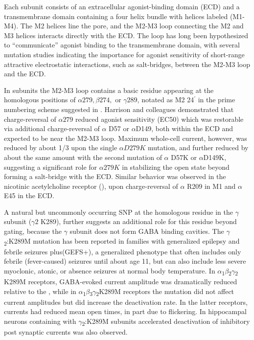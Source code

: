 \documentclass[9pt,twocolumn,twoside,lineno]{pnas-new}
\begin{document}
Each subunit consists of an extracellular agonist-binding domain (ECD) and a transmembrane domain containing a four helix bundle with helices labeled (M1-M4).  The M2 helices line the pore, and the M2-M3 loop connecting the M2 and M3 helices interacts directly with the ECD.  The loop has long been hypothesized to ``communicate'' agonist binding to the transmembrane domain,\cite{Campos-Caro1996,Lynch1997,Grosman2000,Bera2002,Lummis2005,Law2005,Lee2005,Unwin2005, Lee2009} with several mutation studies indicating the importance for agonist sensitivity of short-range attractive electrostatic interactions, such as salt-bridges, between the M2-M3 loop and the ECD. \cite{Sigel1999, OShea2000, Kash2003, Hales2006} 

In \GABAA subunits the M2-M3 loop contains a basic residue appearing at the homologous positions of $\alpha279, \beta274,$ or $\gamma289$, notated as M2 24$^{\prime}$ in the prime numbering scheme suggested in \cite{Jaiteh2016}.  Harrison and colleagues\cite{Kash2003} demonstrated that charge-reversal of $\alpha279$ reduced agonist sensitivity (EC50) which was restorable via additional charge-reversal of $\alpha$ D57 or $\alpha$D149, both within the ECD and expected to be near the M2-M3 loop.  Maximum whole-cell current, however, was reduced by about 1/3 upon the single $\alpha D279K$ mutation, and further reduced by about the same amount with the second mutation of $\alpha$ D57K or $\alpha$D149K, suggesting a significant role for $\alpha279K$ in stabilizing the open state beyond forming a salt-bridge with the ECD.  Similar behavior was observed in the nicotinic acetylcholine receptor (\nachr), upon charge-reversal of  $\alpha$ R209 in M1 and $\alpha$ E45 in the ECD.\cite{Lee2005}  

A natural but uncommonly occurring SNP at the homologous residue in the $\gamma$ subunit ($\gamma2$ K289), further suggests an additional role for this residue beyond gating, because the $\gamma$ subunit does not form GABA binding cavities. The \(\gamma\)\textsubscript{2}:K289M mutation has been reported in families with generalized epilepsy and febrile seizures plus(GEFS+)\cite{Mac2010,Baulac2001,Bianchi2002}, a generalized phenotype that often includes only febrile (fever-caused) seizures until about age 11, but can also include less severe myoclonic, atonic, or absence seizures at normal body temperature.  In \(\alpha\)\textsubscript{1}\(\beta\)\textsubscript{2}\(\gamma\)\textsubscript{2} K289M receptors, GABA-evoked current amplitude was dramatically reduced relative to the \WT \cite{Baulac2001,Ramakrishnan2004}, while in \(\alpha\)\textsubscript{1}\(\beta\)\textsubscript{3}\(\gamma\)\textsubscript{2}K289M receptors the mutation did not affect current amplitudes but did increase the deactivation rate\cite{Eugene2007}. In the latter receptors, currents had reduced mean open times, in part due to flickering\cite{Bianchi2002,Macdonald2006,Hales2006}. In hippocampal neurons containing \GABAA with \(\gamma\)\textsubscript{2}:K289M subunits %
accelerated deactivation of inhibitory post synaptic currents was also observed\cite{Eugene2007}.
\end{document}
